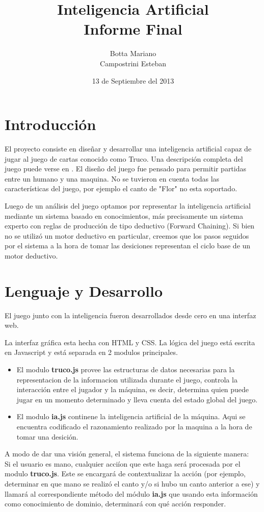 \documentclass[12pt,a4paper]{article}
\title{Inteligencia Artificial\\ 
\large Informe Final
}
\author{Botta Mariano \\ Campostrini Esteban}
\date{ \small 13 de Septiembre del 2013}
\begin{document}
\maketitle 

\section{Introducci\'on}
El proyecto consiste en diseñar y desarrollar una inteligencia artificial capaz de jugar al juego de cartas conocido como Truco.
Una descripci\'on completa del juego puede verse en \cite{reglas}. El dise\~no del juego fue pensado para permitir partidas 
entre un humano y una maquina. No se tuvieron en cuenta todas las caracter\'isticas del juego, por ejemplo el canto de "Flor" 
no esta soportado. 

Luego de un an\'alisis del juego optamos por representar la inteligencia artificial mediante un sistema basado en conocimientos, 
más precisamente un sistema experto con reglas de producción de tipo deductivo (Forward Chaining). Si bien no se utiliz\'o un motor
deductivo en particular, creemos que los pasos seguidos por el sistema a la hora de tomar las desiciones representan el ciclo
base de un motor deductivo.

\section{Lenguaje y Desarrollo}
El juego junto con la inteligencia fueron desarrollados desde cero en una interfaz web. 

La interfaz gr\'afica esta hecha con HTML y CSS. La l\'ogica del juego est\'a escrita en Javascript y est\'a separada en 2 modulos principales.  
\begin{itemize}
\item El modulo \textbf{truco.js} provee las estructuras de datos necesarias para la representacion de la informacion utilizada durante el juego,
controla la interacci\'on entre el jugador y la m\'aquina, es decir, determina quien puede jugar en un momento determinado y lleva cuenta del
estado global del juego.

\item El modulo \textbf{ia.js} continene la inteligencia artificial de la m\'aquina. Aqui se encuentra codificado el razonamiento realizado por la maquina
a la hora de tomar una desici\'on.

\end{itemize}

A modo de dar una visi\'on general, el sistema funciona de la siguiente manera: \\
Si el usuario es mano, cualquier acci\'ion que este haga ser\'a procesada por el modulo \textbf{truco.js}. Este se encargar\'a de contextualizar la
acci\'on (por ejemplo, determinar en que mano se realiz\'o el canto y/o si hubo un canto anterior a ese) y llamar\'a al correspondiente m\'etodo del
m\'odulo \textbf{ia.js} que usando esta informaci\'on como conocimiento de dominio, determinar\'a con qu\'e acci\'on responder.
\end{document}
